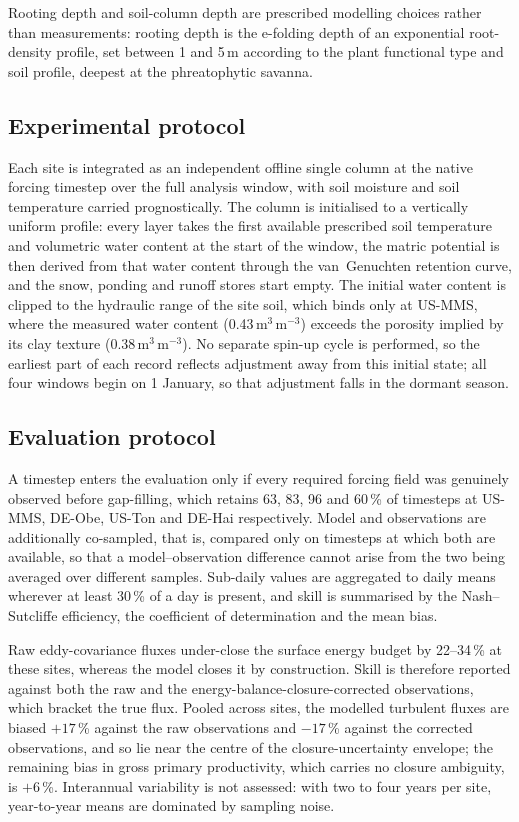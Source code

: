 Rooting depth and soil-column depth are prescribed modelling choices rather than
measurements: rooting depth is the e-folding depth of an exponential
root-density profile, set between 1 and 5\,m according to the plant functional
type and soil profile, deepest at the phreatophytic savanna.

\subsection{Experimental protocol}

Each site is integrated as an independent offline single column at the native
forcing timestep over the full analysis window, with soil moisture and soil
temperature carried prognostically. The column is initialised to a vertically
uniform profile: every layer takes the first available prescribed soil
temperature and volumetric water content at the start of the window, the matric
potential is then derived from that water content through the van~Genuchten
retention curve, and the snow, ponding and runoff stores start empty. The
initial water content is clipped to the hydraulic range of the site soil,
which binds only at US-MMS, where the measured water content (0.43\,m$^3$\,m$^{-3}$)
exceeds the porosity implied by its clay texture (0.38\,m$^3$\,m$^{-3}$). No
separate spin-up cycle is performed, so the earliest part of each record reflects
adjustment away from this initial state; all four windows begin on 1 January, so
that adjustment falls in the dormant season.

\subsection{Evaluation protocol}

A timestep enters the evaluation only if every required forcing field was
genuinely observed before gap-filling, which retains 63, 83, 96 and 60\,\% of
timesteps at US-MMS, DE-Obe, US-Ton and DE-Hai respectively. Model and
observations are additionally co-sampled, that is, compared only on timesteps at
which both are available, so that a model--observation difference cannot arise
from the two being averaged over different samples. Sub-daily values are
aggregated to daily means wherever at least 30\,\% of a day is present, and skill
is summarised by the Nash--Sutcliffe efficiency, the coefficient of determination
and the mean bias.

Raw eddy-covariance fluxes under-close the surface energy budget by 22--34\,\% at
these sites, whereas the model closes it by construction. Skill is therefore
reported against both the raw and the energy-balance-closure-corrected
observations, which bracket the true flux. Pooled across sites, the modelled
turbulent fluxes are biased $+17$\,\% against the raw observations and $-17$\,\%
against the corrected observations, and so lie near the centre of the
closure-uncertainty envelope; the remaining bias in gross primary productivity,
which carries no closure ambiguity, is $+6$\,\%. Interannual variability is not
assessed: with two to four years per site, year-to-year means are dominated by
sampling noise.

